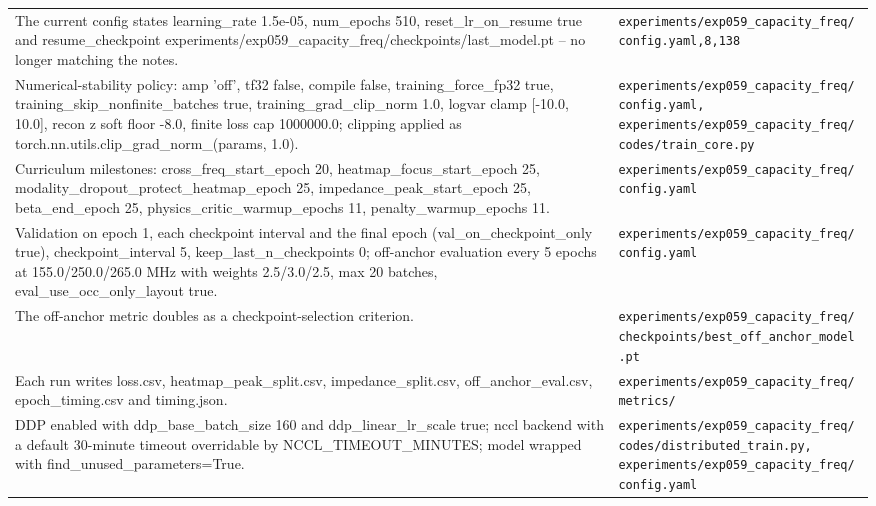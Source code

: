 \begin{longtable}{p{} p{}}
The current config states learning\_rate 1.5e-05, num\_epochs 510, reset\_lr\_on\_resume true and resume\_checkpoint experiments/exp059\_capacity\_freq/checkpoints/last\_model.pt -- no longer matching the notes. & \texttt{experiments/\allowbreak{}exp059\_\allowbreak{}capacity\_\allowbreak{}freq/\allowbreak{}config.yaml,8,138} \\
Numerical-stability policy: amp 'off', tf32 false, compile false, training\_force\_fp32 true, training\_skip\_nonfinite\_batches true, training\_grad\_clip\_norm 1.0, logvar clamp [-10.0, 10.0], recon z soft floor -8.0, finite loss cap 1000000.0; clipping applied as torch.nn.utils.clip\_grad\_norm\_(params, 1.0). & \texttt{experiments/\allowbreak{}exp059\_\allowbreak{}capacity\_\allowbreak{}freq/\allowbreak{}config.yaml, experiments/\allowbreak{}exp059\_\allowbreak{}capacity\_\allowbreak{}freq/\allowbreak{}codes/\allowbreak{}train\_\allowbreak{}core.py} \\
Curriculum milestones: cross\_freq\_start\_epoch 20, heatmap\_focus\_start\_epoch 25, modality\_dropout\_protect\_heatmap\_epoch 25, impedance\_peak\_start\_epoch 25, beta\_end\_epoch 25, physics\_critic\_warmup\_epochs 11, penalty\_warmup\_epochs 11. & \texttt{experiments/\allowbreak{}exp059\_\allowbreak{}capacity\_\allowbreak{}freq/\allowbreak{}config.yaml} \\
Validation on epoch 1, each checkpoint interval and the final epoch (val\_on\_checkpoint\_only true), checkpoint\_interval 5, keep\_last\_n\_checkpoints 0; off-anchor evaluation every 5 epochs at 155.0/250.0/265.0 MHz with weights 2.5/3.0/2.5, max 20 batches, eval\_use\_occ\_only\_layout true. & \texttt{experiments/\allowbreak{}exp059\_\allowbreak{}capacity\_\allowbreak{}freq/\allowbreak{}config.yaml} \\
The off-anchor metric doubles as a checkpoint-selection criterion. & \texttt{experiments/\allowbreak{}exp059\_\allowbreak{}capacity\_\allowbreak{}freq/\allowbreak{}checkpoints/\allowbreak{}best\_\allowbreak{}off\_\allowbreak{}anchor\_\allowbreak{}model.pt} \\
Each run writes loss.csv, heatmap\_peak\_split.csv, impedance\_split.csv, off\_anchor\_eval.csv, epoch\_timing.csv and timing.json. & \texttt{experiments/\allowbreak{}exp059\_\allowbreak{}capacity\_\allowbreak{}freq/\allowbreak{}metrics/\allowbreak{}} \\
DDP enabled with ddp\_base\_batch\_size 160 and ddp\_linear\_lr\_scale true; nccl backend with a default 30-minute timeout overridable by NCCL\_TIMEOUT\_MINUTES; model wrapped with find\_unused\_parameters=True. & \texttt{experiments/\allowbreak{}exp059\_\allowbreak{}capacity\_\allowbreak{}freq/\allowbreak{}codes/\allowbreak{}distributed\_\allowbreak{}train.py, experiments/\allowbreak{}exp059\_\allowbreak{}capacity\_\allowbreak{}freq/\allowbreak{}config.yaml} \\

\end{longtable}
